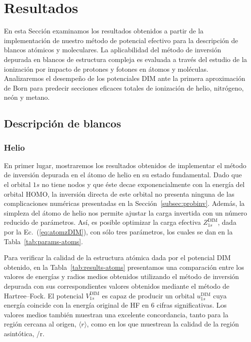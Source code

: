 \newpage
\section{Resultados}
\label{sec:dimresultados}

En esta Sección examinamos los resultados obtenidos a partir de la 
implementación de nuestro método de potencial efectivo para la 
descripción de blancos atómicos y moleculares. La aplicabilidad del 
método de inversión depurada en blancos de estructura compleja es 
evaluada a través del estudio de la ionización por impacto de protones y 
fotones en átomos y moléculas. Analizaremos el desempeño de los  
potenciales DIM ante la primera aproximación de Born para predecir 
secciones eficaces totales de ionización de helio, nitrógeno, neón y 
metano.

\subsection{Descripción de blancos}
\label{subsec:dimtarget}

\subsubsection*{Helio}

En primer lugar, mostraremos los resultados obtenidos de implementar
el método de inversión depurada en el átomo de helio en su estado
fundamental. Dado que el orbital $1s$ no tiene nodos y que éste 
decae exponencialmente con la energía del orbital HOMO, la inversión 
directa de este orbital no presenta ninguna de las complicaciones 
numéricas presentadas en la Sección~\ref{subsec:probinv}. Además, la 
simpleza del átomo de helio nos permite ajustar la carga invertida con 
un número reducido de parámetros. Así, es posible optimizar la carga 
efectiva $Z_{1s}^{\mathrm{ DIM}}$, dada por la Ec.~(\ref{eq:atomzDIM}), 
con sólo tres parámetros, los cuales se dan en la 
Tabla~\ref{tab:params-atoms}.

Para verificar la calidad de la estructura atómica dada por el potencial DIM obtenido, en la Tabla~\ref{tab:results-atoms} presentamos una comparación entre los valores de energías y radios medios obtenidos utilizando el método de inversión depurada con sus correspondientes valores obtenidos mediante el método de Hartree--Fock. El potencial $V_{1s}^{\mathrm{ DIM}}$ es capaz de producir un orbital $u_{1s}^{\mathrm{ DIM}}$ cuya energía coincide con la energía original de HF en 6 cifras significativas. Los valores medios también muestran una excelente concordancia, tanto para la región cercana al origen, $\langle r \rangle$, como en los que muestrean la calidad de la región asintótica, /r\rangle.

